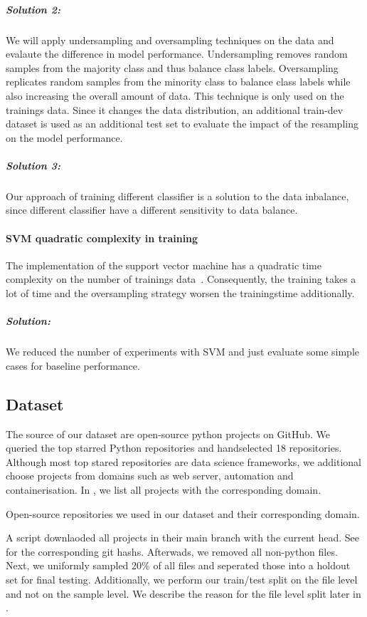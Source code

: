 \subparagraph{Solution 2:}
We will apply undersampling and oversampling techniques on the data and evalaute the difference in model performance. Undersampling removes random samples from the majority class and thus balance class labels. Oversampling replicates random samples from the minority class to balance class labels while also increasing the overall amount of data. This technique is only used on the trainings data. Since it changes the data distribution, an additional train-dev dataset is used as an additional test set to evaluate the impact of the resampling on the model performance. 

\subparagraph{Solution 3:}
Our approach of training different classifier is a solution to the data inbalance, since different classifier have a different sensitivity to data balance. 

\paragraph{SVM quadratic complexity in training}\label{sec:svm_quadratic_complexity}
The implementation of the support vector machine has a quadratic time complexity on the number of trainings data~\cite{abdiansah_time_2015}. Consequently, the training takes a lot of time and the oversampling strategy worsen the trainingstime additionally. 
\subparagraph{Solution:}
We reduced the number of experiments with SVM and just evaluate some simple cases for baseline performance. 


\subsection{Dataset}\label{chap:clean_code_classification_dataset}
The source of our dataset are open-source python projects on GitHub. We queried the top starred Python repositories and handselected 18 repositories. Although most top stared repositories are data science frameworks, we additional choose projects from domains such as web server, automation and containerisation. In , we list all projects with the corresponding domain.
\begin{table}[h]
    \centering
    \caption{Open-source repositories we used in our dataset and their corresponding domain. }
    \label{tab:repos_domains}
\end{table}

A script downlaoded all projects in their main branch with the current head. See  for the corresponding git hashs. Afterwads, we removed all non-python files. 
Next, we uniformly sampled 20\% of all files and seperated those into a holdout set for final testing. Additionally, we perform our train/test split on the file level and not on the sample level. We describe the reason for the file level split later in .

